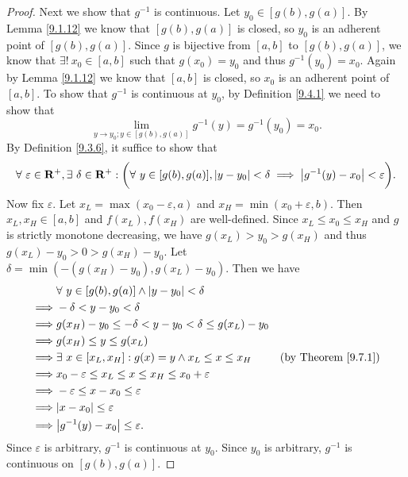 \begin{proof}
    Next we show that \(g^{-1}\) is continuous.
    Let \(y_0 \in [g(b), g(a)]\).
    By Lemma \ref{9.1.12} we know that \([g(b), g(a)]\) is closed, so \(y_0\) is an adherent point of \([g(b), g(a)]\).
    Since \(g\) is bijective from \([a, b]\) to \([g(b), g(a)]\), we know that \(\exists!\ x_0 \in [a, b]\) such that \(g(x_0) = y_0\) and thus \(g^{-1}(y_0) = x_0\).
    Again by Lemma \ref{9.1.12} we know that \([a, b]\) is closed, so \(x_0\) is an adherent point of \([a, b]\).
    To show that \(g^{-1}\) is continuous at \(y_0\), by Definition \ref{9.4.1} we need to show that
    \[
        \lim_{y \to y_0 ; y \in [g(b), g(a)]} g^{-1}(y) = g^{-1}(y_0) = x_0.
    \]
    By Definition \ref{9.3.6}, it suffice to show that
    \[
        \forall\ \varepsilon \in \mathbf{R}^+, \exists\ \delta \in \mathbf{R}^+ : \bigg(\forall\ y \in [g(b), g(a)], \abs*{y - y_0} < \delta \implies \abs*{g^{-1}(y) - x_0} < \varepsilon\bigg).
    \]
    Now fix \(\varepsilon\).
    Let \(x_L = \max(x_0 - \varepsilon, a)\) and \(x_H = \min(x_0 + \varepsilon, b)\).
    Then \(x_L, x_H \in [a, b]\) and \(f(x_L), f(x_H)\) are well-defined.
    Since \(x_L \leq x_0 \leq x_H\) and \(g\) is strictly monotone decreasing, we have \(g(x_L) > y_0 > g(x_H)\) and thus \(g(x_L) - y_0 > 0 > g(x_H) - y_0\).
    Let \(\delta = \min(-(g(x_H) - y_0), g(x_L) - y_0)\).
    Then we have
    \begin{align*}
        & \forall\ y \in [g(b), g(a)] \land \abs*{y - y_0} < \delta \\
        \implies & -\delta < y - y_0 < \delta \\
        \implies & g(x_H) - y_0 \leq -\delta < y - y_0 < \delta \leq g(x_L) - y_0 \\
        \implies & g(x_H) \leq y \leq g(x_L) \\
        \implies & \exists\ x \in [x_L, x_H] : g(x) = y \land x_L \leq x \leq x_H & \text{(by Theorem \ref{9.7.1})} \\
        \implies & x_0 - \varepsilon \leq x_L \leq x \leq x_H \leq x_0 + \varepsilon \\
        \implies & -\varepsilon \leq x - x_0 \leq \varepsilon \\
        \implies & \abs*{x - x_0} \leq \varepsilon \\
        \implies & \abs*{g^{-1}(y) - x_0} \leq \varepsilon.
    \end{align*}
    Since \(\varepsilon\) is arbitrary, \(g^{-1}\) is continuous at \(y_0\).
    Since \(y_0\) is arbitrary, \(g^{-1}\) is continuous on \([g(b), g(a)]\).


\end{proof}
